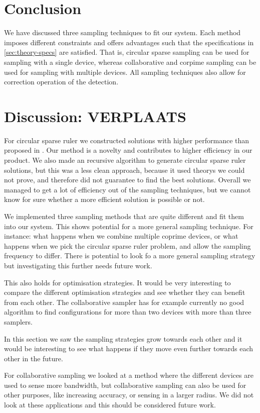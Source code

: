 \documentclass[a4paper, openany, oneside]{memoir}
\begin{document}
\section{Conclusion}
We have discussed three sampling techniques to fit our system. Each method imposes different constraints and offers advantages such that the specifications in \cref{sec:theory-specs} are satisfied. That is, circular sparse sampling can be used for sampling with a single device, whereas collaborative and corpime sampling can be used for sampling with multiple devices.  All sampling techniques also allow for correction operation of the detection.

\section{Discussion: VERPLAATS}
For circular sparse ruler we constructed solutions with higher performance than proposed in \cite{ariananda2012compressive}. Our method is a novelty and contributes to higher efficiency in our product. We also made an recursive algorithm to generate circular sparse ruler solutions,  but this was a less clean approach, because it used  theorys we could not prove, and therefore did not guarantee to find the best solutions. Overall we managed to get a lot of efficiency out of the sampling techniques, but we cannot know for sure whether a more efficient solution is possible or not.

We implemented three sampling methods that are quite different and fit them into our system. This shows potential for a more general sampling technique. For instance: what happens when we combine multiple coprime devices, or what happens when we pick the circular sparse ruler problem, and allow the sampling frequency to differ. There is potential to look fo a more general sampling strategy but investigating this further needs future work.

This also holds for optimisation strategies. It would be very interesting to compare the different optimisation strategies and see whether they can benefit from each other. The collaborative sampler has for example currently no good algorithm to find configurations for more than two devices with more than three samplers. 

In this section we saw the sampling strategies grow towards each other and it would be interesting to see what happens if they move even further towards each other in the future. 

For collaborative sampling we looked at a method where the different devices are used to sense more bandwidth, but collaborative sampling can also be used for other purposes, like increasing accuracy, or sensing in a larger radius. We did not look at these applications and this should be considered future work.
\end{document}
